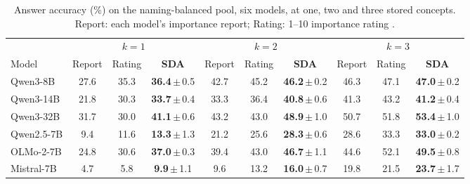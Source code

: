 \begin{table}[t]
\centering
\caption{Answer accuracy (\%) on the naming-balanced pool, six models, at one, two and three stored concepts. Report:
each model's importance report; Rating: 1--10 importance rating
\citep{park2023generative}.}
\label{tab:namingrecall}
\small
\setlength{\tabcolsep}{3.5pt}
\begin{tabular}{lccccccccc}
\toprule
& \multicolumn{3}{c}{$k=1$} & \multicolumn{3}{c}{$k=2$} & \multicolumn{3}{c}{$k=3$} \\
\cmidrule(lr){2-4} \cmidrule(lr){5-7} \cmidrule(lr){8-10}
Model & Report & Rating & \textbf{SDA} & Report & Rating & \textbf{SDA} & Report & Rating & \textbf{SDA} \\
\midrule
Qwen3-8B & 27.6 & 35.3 & \textbf{36.4}\,$\pm$\,0.5 & 42.7 & 45.2 & \textbf{46.2}\,$\pm$\,0.2 & 46.3 & 47.1 & \textbf{47.0}\,$\pm$\,0.2 \\
Qwen3-14B & 21.8 & 30.3 & \textbf{33.7}\,$\pm$\,0.4 & 33.3 & 36.4 & \textbf{40.8}\,$\pm$\,0.6 & 41.3 & 43.2 & \textbf{41.2}\,$\pm$\,0.4 \\
Qwen3-32B & 31.7 & 30.0 & \textbf{41.1}\,$\pm$\,0.6 & 43.2 & 43.0 & \textbf{48.9}\,$\pm$\,1.0 & 50.7 & 51.8 & \textbf{53.4}\,$\pm$\,1.0 \\
Qwen2.5-7B & 9.4 & 11.6 & \textbf{13.3}\,$\pm$\,1.3 & 21.2 & 25.6 & \textbf{28.3}\,$\pm$\,0.6 & 28.6 & 33.3 & \textbf{33.0}\,$\pm$\,0.2 \\
OLMo-2-7B & 24.8 & 30.6 & \textbf{37.0}\,$\pm$\,0.3 & 39.4 & 43.0 & \textbf{46.7}\,$\pm$\,1.1 & 44.6 & 52.1 & \textbf{49.5}\,$\pm$\,0.8 \\
Mistral-7B & 4.7 & 5.8 & \textbf{9.9}\,$\pm$\,1.1 & 9.6 & 13.2 & \textbf{16.0}\,$\pm$\,0.7 & 19.8 & 21.5 & \textbf{23.7}\,$\pm$\,1.7 \\
\bottomrule
\end{tabular}
\end{table}
